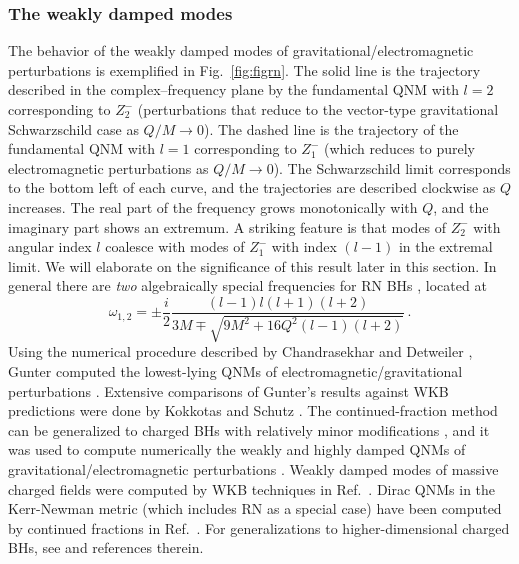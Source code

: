\documentclass[]{iopart}
\def\be{\begin{equation}}
\def\ee{\end{equation}}
\begin{document}
\subsubsection*{The weakly damped modes}

The behavior of the weakly damped modes of gravitational/electromagnetic
perturbations is exemplified in Fig.~\ref{fig:figrn}. The solid line is the
trajectory described in the complex--frequency plane by the fundamental QNM
with $l=2$ corresponding to $Z_2^-$ (perturbations that reduce to the
vector-type gravitational Schwarzschild case as $Q/M\to 0$). The dashed line
is the trajectory of the fundamental QNM with $l=1$ corresponding to $Z_1^-$
(which reduces to purely electromagnetic perturbations as $Q/M\to 0$). The
Schwarzschild limit corresponds to the bottom left of each curve, and the
trajectories are described clockwise as $Q$ increases. The real part of the
frequency grows monotonically with $Q$, and the imaginary part shows an
extremum.  A striking feature is that modes of $Z_2^-$ with angular index $l$
coalesce with modes of $Z_1^-$ with index $(l-1)$ in the extremal limit. We
will elaborate on the significance of this result later in this section.
%
In general there are {\em two} algebraically special frequencies for RN BHs
\cite{chandraspecial}, located at
%
\be\label{RNas} \omega_{1,2}=\pm \frac{i}{2}
\frac{(l-1)l(l+1)(l+2)}{3M\mp \sqrt{9M^2+16 Q^2(l-1)(l+2)}}\,.
\ee
%
Using the numerical procedure described by Chandrasekhar and Detweiler
\cite{Chandrasekhar:1975qn}, Gunter computed the lowest-lying QNMs of
electromagnetic/gravitational perturbations \cite{Gunter:1979}. Extensive
comparisons of Gunter's results against WKB predictions were done by Kokkotas
and Schutz \cite{Kokkotas:1988fm}.  The continued-fraction method can be
generalized to charged BHs with relatively minor modifications
\cite{LeaverRN}, and it was used to compute numerically the weakly and highly
damped QNMs of gravitational/electromagnetic perturbations
\cite{LeaverRN,Andersson1993,Onozawa:1995vu,
  Andersson:1996xw,Berti:2004md,Berti:2003zu}.  Weakly damped modes of massive
charged fields were computed by WKB techniques in Ref.~\cite{Chang:2007zza}.
Dirac QNMs in the Kerr-Newman metric (which includes RN as a special case)
have been computed by continued fractions in Ref.~\cite{Jing:2005pk}. For
generalizations to higher-dimensional charged BHs, see
\cite{Chakrabarti:2008xz} and references therein.
\end{document}
